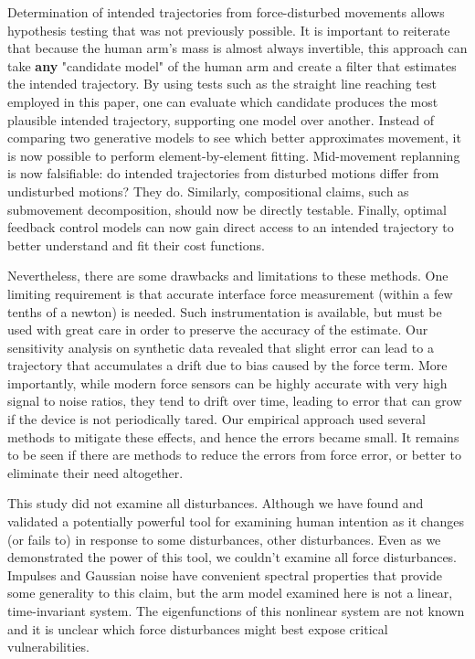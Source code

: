 \documentclass[10pt]{article}
\begin{document}
Determination of intended trajectories from force-disturbed movements allows hypothesis testing that was not previously possible. It is important to reiterate that because the human arm’s mass is almost always invertible, this approach can take \textbf{any} "candidate model" of the human arm and create a filter that estimates the intended trajectory. By using tests such as the straight line reaching test employed in this paper, one can evaluate which candidate produces the most plausible intended trajectory, supporting one model over another.  Instead of comparing two generative models to see which better approximates movement, it is now possible to perform element-by-element fitting. Mid-movement replanning is now falsifiable: do intended trajectories from disturbed motions differ from undisturbed motions? They do. Similarly, compositional claims, such as submovement decomposition, should now be directly testable. Finally, optimal feedback control models can now gain direct access to an intended trajectory to better understand and fit their cost functions.

Nevertheless, there are some drawbacks and limitations to these methods.  One limiting requirement is that accurate interface force measurement (within a few tenths of a newton) is needed. Such instrumentation is available, but must be used with great care in order to preserve the accuracy of the estimate. Our sensitivity analysis on synthetic data revealed that slight error can lead to a trajectory that accumulates a drift due to bias caused by the force term. More importantly, while modern force sensors can be highly accurate with very high signal to noise ratios, they tend to drift over time, leading to error that can grow if the device is not periodically tared. Our empirical approach used several methods to mitigate these effects, and hence the errors became small. It remains to be seen if there are methods to reduce the errors from force error, or better to eliminate their need altogether.  

This study did not examine all disturbances. Although we have found and validated a potentially powerful tool for examining human intention as it changes (or fails to) in response to some disturbances, other disturbances. Even as we demonstrated the power of this tool, we couldn’t examine all force disturbances. Impulses and Gaussian noise have convenient spectral properties that provide some generality to this claim, but the arm model examined here is not a linear, time-invariant system. The eigenfunctions of this nonlinear system are not known and it is unclear which force disturbances might best expose critical vulnerabilities. 
\end{document}
